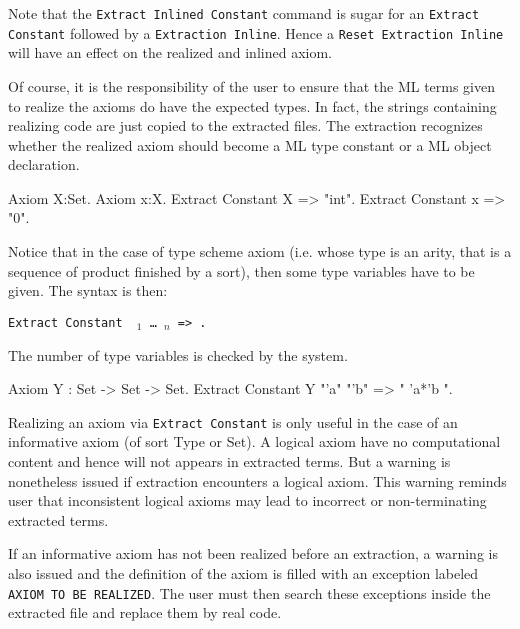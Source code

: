 \noindent Note that the {\tt Extract Inlined Constant} command is sugar
for an {\tt Extract Constant} followed by a {\tt Extraction Inline}. 
Hence a {\tt Reset Extraction Inline} will have an effect on the
realized and inlined axiom.

Of course, it is the responsibility of the user to ensure that the ML
terms given to realize the axioms do have the expected types.  In
fact, the strings containing realizing code are just copied to the
extracted files. The extraction recognizes whether the realized axiom
should become a ML type constant or a ML object declaration.

\Example
\begin{coq_example*}
Axiom X:Set.
Axiom x:X.
Extract Constant X => "int".
Extract Constant x => "0".
\end{coq_example*}

\noindent Notice that in the case of type scheme axiom (i.e. whose type is an
arity, that is a sequence of product finished by a sort), then some type
variables have to be given. The syntax is then:

\begin{description}
\item{\tt Extract Constant \qualid\ \str$_1$ \dots\ \str$_n$ => \str.}
\end{description}

\noindent The number of type variables is checked by the system. 

\Example
\begin{coq_example*}
Axiom Y : Set -> Set -> Set.
Extract Constant Y "'a" "'b" => " 'a*'b ".
\end{coq_example*}

\noindent Realizing an axiom via {\tt Extract Constant} is only useful in the
case of an informative axiom (of sort Type or Set). A logical axiom
have no computational content and hence will not appears in extracted
terms. But a warning is nonetheless issued if extraction encounters a
logical axiom. This warning reminds user that inconsistent logical
axioms may lead to incorrect or non-terminating extracted terms.

If an informative axiom has not been realized before an extraction, a
warning is also issued and the definition of the axiom is filled with
an exception labeled {\tt AXIOM TO BE REALIZED}. The user must then
search these exceptions inside the extracted file and replace them by
real code.



